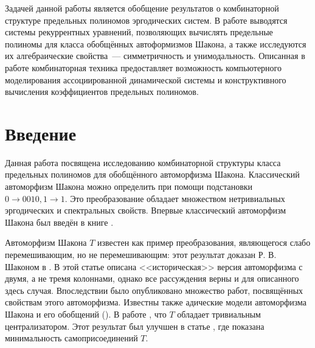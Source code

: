\documentclass[14pt, a4paper, russian]{report}
\begin{document}
Задачей данной работы является обобщение результатов о комбинаторной структуре 
предельных полиномов эргодических систем. В работе выводятся 
системы рекуррентных уравнений, позволяющих вычислять предельные полиномы 
для класса обобщённых автоформизмов Шакона, а также исследуются их алгебраические 
свойства~--- симметричность и унимодальность. 
Описанная в работе комбинаторная техника предоставляет возможность 
компьютерного моделирования ассоциированной динамической системы и
конструктивного вычисления коэффициентов предельных полиномов.


\tableofcontents{}

\chapter*{Введение}
Данная работа посвящена исследованию комбинаторной структуры класса предельных полиномов для обобщённого автоморфизма Шакона. Классический автоморфизм Шакона можно определить при помощи подстановки $0 \to 0010, 1 \to 1$. Это преобразование обладает множеством нетривиальных эргодических и спектральных свойств. Впервые классический автоморфизм Шакона был введён в книге \cite{friedman}. 

Автоморфизм Шакона $T$ известен как пример преобразования, являющегося слабо перемешивающим, но не перемешивающим: этот результат доказан Р. В. Шаконом в \cite{mixing}. В этой статье описана <<историческая>> версия автоморфизма с двумя, а не тремя колоннами, однако все рассуждения верны и для описанного здесь случая. Впоследствии было опубликовано множество работ, посвящённых свойствам этого автоморфизма. Известны также адические модели автоморфизма Шакона и его обобщений (\cite{park}). В работе \cite{deljunco}, что $T$ обладает тривиальным централизатором. Этот результат был улучшен в статье \cite{joinings}, где показана минимальность самоприсоединений $T$. 
\end{document}
